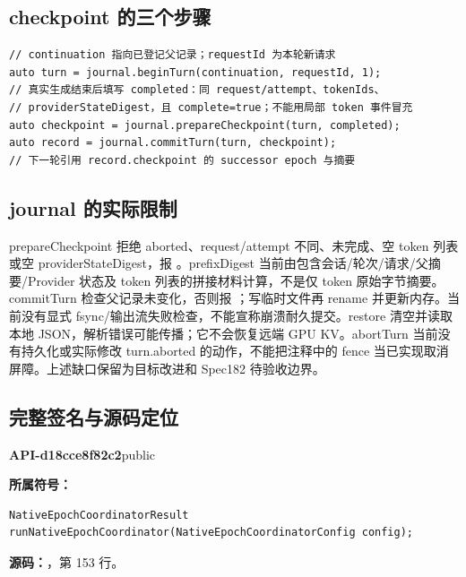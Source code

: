 \subsection{checkpoint 的三个步骤}

\begin{Verbatim}[fontsize=\footnotesize,breaklines,breakanywhere]
// continuation 指向已登记父记录；requestId 为本轮新请求
auto turn = journal.beginTurn(continuation, requestId, 1);
// 真实生成结束后填写 completed：同 request/attempt、tokenIds、
// providerStateDigest，且 complete=true；不能用局部 token 事件冒充
auto checkpoint = journal.prepareCheckpoint(turn, completed);
auto record = journal.commitTurn(turn, checkpoint);
// 下一轮引用 record.checkpoint 的 successor epoch 与摘要
\end{Verbatim}

\subsection{journal 的实际限制}
prepareCheckpoint 拒绝 aborted、request/attempt 不同、未完成、空 token 列表或空 providerStateDigest，报 。prefixDigest 当前由包含会话/轮次/请求/父摘要/Provider 状态及 token 列表的拼接材料计算，不是仅 token 原始字节摘要。commitTurn 检查父记录未变化，否则报 ；写临时文件再 rename 并更新内存。当前没有显式 fsync/输出流失败检查，不能宣称崩溃耐久提交。restore 清空并读取本地 JSON，解析错误可能传播；它不会恢复远端 GPU KV。abortTurn 当前没有持久化或实际修改 turn.aborted 的动作，不能把注释中的 fence 当已实现取消屏障。上述缺口保留为目标改进和 Spec182 待验收边界。

\subsection{完整签名与源码定位}

\textbf{API-d18cce8f82c2}\quad public\par
\textbf{所属符号：}\par
\begin{Verbatim}[fontsize=\footnotesize,breaklines,breakanywhere]
NativeEpochCoordinatorResult
runNativeEpochCoordinator(NativeEpochCoordinatorConfig config);
\end{Verbatim}
\textbf{源码：}，第 153 行。\par

